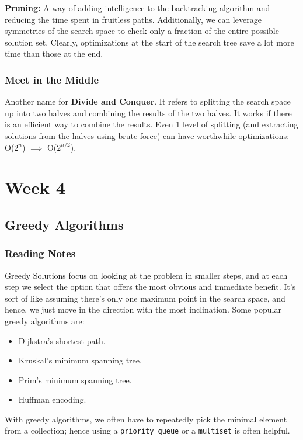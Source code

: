 \documentclass{report}
\begin{document}
\textbf{Pruning:} A way of adding intelligence to the backtracking algorithm and
reducing the time spent in fruitless paths. Additionally, we can leverage symmetries
of the search space to check only a fraction of the entire possible solution set. Clearly,
optimizations at the start of the search tree save a lot more time than those at the end.
\subsection*{Meet in the Middle}
Another name for \textbf{Divide and Conquer}. It refers to splitting the search space up
into two halves and combining the results of the two halves. It works if there is an
efficient way to combine the results. Even 1 level of splitting (and extracting solutions
from the halves using brute force) can have worthwhile optimizations: O($2^n$) $\implies$ O($2^{n/2}$).

\chapter{Week 4}
\section{Greedy Algorithms}
\subsection*{\href{https://leetcode.com/discuss/general-discussion/1061059/ABCs-of-Greedy}{Reading Notes}}
Greedy Solutions focus on looking at the problem in smaller steps, and at each step
we select the option that offers the most obvious and immediate benefit. It's sort
of like assuming there's only one maximum point in the search space, and hence,
we just move in the direction with the most inclination. Some popular greedy 
algorithms are:
\begin{itemize}
    \item Dijkstra's shortest path.
    \item Kruskal's minimum spanning tree.
    \item Prim's minimum spanning tree.
    \item Huffman encoding.
\end{itemize}
With greedy algorithms, we often have to repeatedly pick
the minimal element from a collection; hence using a \texttt{priority\_queue}
or a \texttt{multiset} is often helpful.
\end{document}
